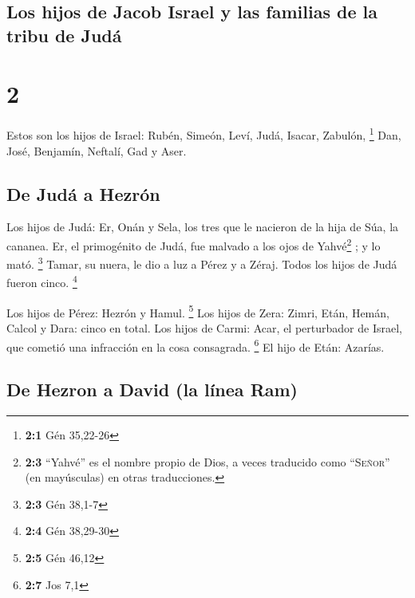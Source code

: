 \hypertarget{los-hijos-de-jacob-israel-y-las-familias-de-la-tribu-de-juduxe1}{%
\subsection{Los hijos de Jacob Israel y las familias de la tribu de
Judá}\label{los-hijos-de-jacob-israel-y-las-familias-de-la-tribu-de-juduxe1}}

\hypertarget{section-1}{%
\section{2}\label{section-1}}

 Estos son los hijos de Israel: Rubén, Simeón, Leví, Judá,
Isacar, Zabulón, \footnote{\textbf{2:1} Gén 35,22-26} 
Dan, José, Benjamín, Neftalí, Gad y Aser.

\hypertarget{de-juduxe1-a-hezruxf3n}{%
\subsection{De Judá a Hezrón}\label{de-juduxe1-a-hezruxf3n}}

 Los hijos de Judá: Er, Onán y Sela, los tres que le
nacieron de la hija de Súa, la cananea. Er, el primogénito de Judá, fue
malvado a los ojos de Yahvé\footnote{\textbf{2:3} ``Yahvé'' es el nombre
  propio de Dios, a veces traducido como ``\textsc{Señor}'' (en
  mayúsculas) en otras traducciones.} ; y lo mató. \footnote{\textbf{2:3}
  Gén 38,1-7}  Tamar, su nuera, le dio a luz a Pérez y a
Zéraj. Todos los hijos de Judá fueron cinco. \footnote{\textbf{2:4} Gén
  38,29-30}

 Los hijos de Pérez: Hezrón y Hamul. \footnote{\textbf{2:5}
  Gén 46,12}  Los hijos de Zera: Zimri, Etán, Hemán,
Calcol y Dara: cinco en total.  Los hijos de Carmi: Acar,
el perturbador de Israel, que cometió una infracción en la cosa
consagrada. \footnote{\textbf{2:7} Jos 7,1}  El hijo de
Etán: Azarías.

\hypertarget{de-hezron-a-david-la-luxednea-ram}{%
\subsection{De Hezron a David (la línea
Ram)}\label{de-hezron-a-david-la-luxednea-ram}}

